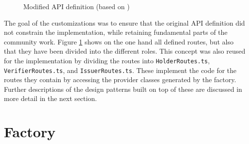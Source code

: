     \begin{figure}[ht]
        \centering
        \caption{Modified API definition (based on \cite{world_wide_web_consortium_credentials_community_group_vc_2021})}
        \label{figure: api definition}
    \end{figure}
    
    
    The goal of the customizations was to ensure that the original API definition did not constrain the implementation, while retaining fundamental parts of the community work. Figure \ref{figure: api definition} shows on the one hand all defined routes, but also that they have been divided into the different roles. This concept was also reused for the implementation by dividing the routes into \texttt{HolderRoutes.ts}, \texttt{VerifierRoutes.ts}, and \texttt{IssuerRoutes.ts}. These implement the code for the routes they contain by accessing the provider classes generated by the factory. Further descriptions of the design patterns built on top of these are discussed in more detail in the next section. 
    \vfill

        
    \section{Factory}
    
